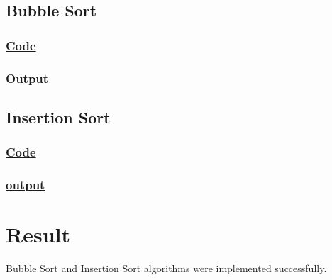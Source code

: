 \subsection{Bubble Sort}

\subsubsection{\underline{Code}}



\subsubsection{\underline{Output}}



\subsection{Insertion Sort}

\subsubsection{\underline{Code}}



\subsubsection{\underline{output}}



\vfill

\section{Result}
{\Large\color{white}
Bubble Sort and Insertion Sort algorithms were implemented successfully.
\color{black}}

\clearpage

